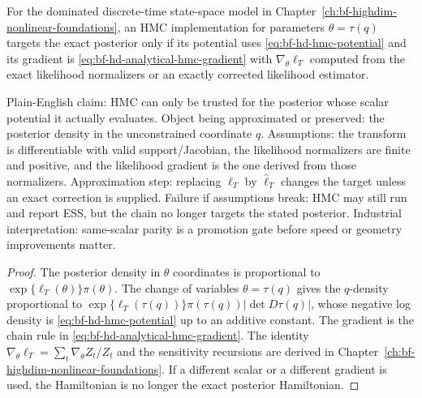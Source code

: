 \begin{proposition}
\label{prop:bf-hd-hmc-gradient-contract}
For the dominated discrete-time state-space model in
Chapter~\ref{ch:bf-highdim-nonlinear-foundations}, an HMC implementation for
parameters \(\theta=\tau(q)\) targets the exact posterior only if its potential
uses \eqref{eq:bf-hd-hmc-potential} and its gradient is
\eqref{eq:bf-hd-analytical-hmc-gradient} with
\(\nabla_\theta\ell_T\) computed from the exact likelihood normalizers or an
exactly corrected likelihood estimator.
\end{proposition}

Plain-English claim: HMC can only be trusted for the posterior whose scalar
potential it actually evaluates.  Object being approximated or preserved:
the posterior density in the unconstrained coordinate \(q\).  Assumptions:
the transform is differentiable with valid support/Jacobian, the likelihood
normalizers are finite and positive, and the likelihood gradient is the one
derived from those normalizers.  Approximation step: replacing
\(\ell_T\) by \(\widehat\ell_T\) changes the target unless an exact correction
is supplied.  Failure if assumptions break: HMC may still run and report ESS,
but the chain no longer targets the stated posterior.  Industrial
interpretation: same-scalar parity is a promotion gate before speed or
geometry improvements matter.

\begin{proof}
The posterior density in \(\theta\) coordinates is proportional to
\(\exp\{\ell_T(\theta)\}\pi(\theta)\).  The change of variables
\(\theta=\tau(q)\) gives the \(q\)-density proportional to
\(\exp\{\ell_T(\tau(q))\}\pi(\tau(q))|\det D\tau(q)|\), whose negative log
density is \eqref{eq:bf-hd-hmc-potential} up to an additive constant.  The
gradient is the chain rule in \eqref{eq:bf-hd-analytical-hmc-gradient}.  The
identity \(\nabla_\theta\ell_T=\sum_t\nabla_\theta Z_t/Z_t\) and the
sensitivity recursions are derived in
Chapter~\ref{ch:bf-highdim-nonlinear-foundations}.  If a different scalar or a
different gradient is used, the Hamiltonian is no longer the exact posterior
Hamiltonian.
\end{proof}

